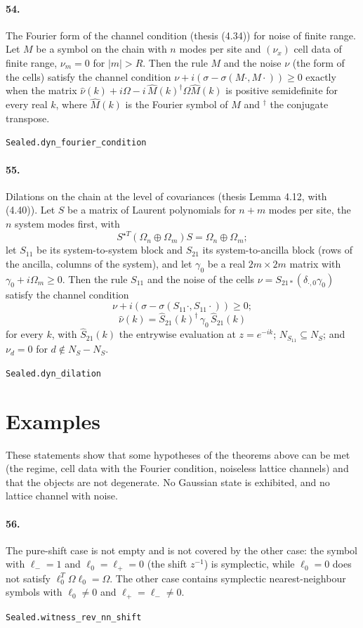 \documentclass[11pt]{article}
\begin{document}
\paragraph{54.} The Fourier form of the channel condition (thesis (4.34)) for noise of finite range. Let $M$ be a symbol on the chain with $n$ modes per site and $(\nu_x)$ cell data of finite range, $\nu_m = 0$ for $|m| > R$. Then the rule $M$ and the noise $\nu$ (the form of the cells) satisfy the channel condition $\nu + i(\sigma - \sigma(M\cdot, M\cdot)) \ge 0$ exactly when the matrix $\hat\nu(k) + i\Omega - i\, \hat M(k)^\dagger \Omega \hat M(k)$ is positive semidefinite for every real $k$, where $\hat M(k)$ is the Fourier symbol of $M$ and ${}^\dagger$ the conjugate transpose.\par{\footnotesize\texttt{Sealed.dyn\_fourier\_condition}}

\paragraph{55.} Dilations on the chain at the level of covariances (thesis Lemma 4.12, with (4.40)). Let $S$ be a matrix of Laurent polynomials for $n + m$ modes per site, the $n$ system modes first, with \[S^{\star T}(\Omega_n \oplus \Omega_m) S = \Omega_n \oplus \Omega_m;\] let $S_{11}$ be its system-to-system block and $S_{21}$ its system-to-ancilla block (rows of the ancilla, columns of the system), and let $\gamma_0$ be a real $2m \times 2m$ matrix with $\gamma_0 + i\Omega_m \ge 0$. Then the rule $S_{11}$ and the noise of the cells $\nu = S_{21 *}(\delta_{\cdot, 0}\gamma_0)$ satisfy the channel condition \[\nu + i(\sigma - \sigma(S_{11}\cdot, S_{11}\cdot)) \ge 0;\] \[\hat\nu(k) = \hat S_{21}(k)^\dagger\, \gamma_0\, \hat S_{21}(k)\] for every $k$, with $\hat S_{21}(k)$ the entrywise evaluation at $z = e^{-ik}$; $N_{S_{11}} \subseteq N_S$; and $\nu_d = 0$ for $d \notin N_S - N_S$.\par{\footnotesize\texttt{Sealed.dyn\_dilation}}

\section*{Examples}
These statements show that some hypotheses of the theorems above can be met (the regime, cell data with the Fourier condition, noiseless lattice channels) and that the objects are not degenerate. No Gaussian state is exhibited, and no lattice channel with noise.

\paragraph{56.} The pure-shift case is not empty and is not covered by the other case: the symbol with $\ell_- = 1$ and $\ell_0 = \ell_+ = 0$ (the shift $z^{-1}$) is symplectic, while $\ell_0 = 0$ does not satisfy $\ell_0^T \Omega \ell_0 = \Omega$. The other case contains symplectic nearest-neighbour symbols with $\ell_0 \neq 0$ and $\ell_+ = \ell_- \neq 0$.\par{\footnotesize\texttt{Sealed.witness\_rev\_nn\_shift}}
\end{document}
